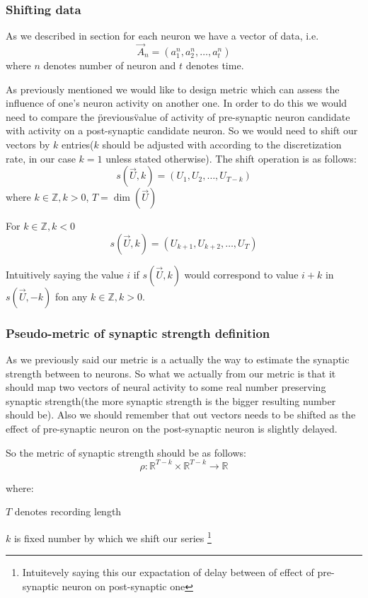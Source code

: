 \documentclass{article}
\begin{document}
	\subsubsection{Shifting data}
	As we described in  section for each neuron we have a vector of data, i.e.
	\[
		\vec{A}_n = (a_1^n, a_2^n, \dots, a_t^n)
	\]
	where $n$ denotes number of neuron and $t$ denotes time.

	As previously mentioned we would like to design metric which can assess the influence of one's neuron activity on
	another one.
	In order to do this we would need to compare the \"previous\" value of activity of pre-synaptic neuron candidate with
	activity on a post-synaptic candidate neuron.
	So we would need to shift our vectors by $k$ entries($k$ should be adjusted with according to the discretization rate,
	in our case $k=1$ unless stated otherwise).
	The shift operation is as follows:
	\[
		s(\vec{U}, k) = (U_1, U_2, \dots, U_{T-k})
	\]
	where $k \in \mathbb{Z}, k > 0$, $T=\dim(\vec{U})$

	For $k\in \mathbb{Z}, k < 0$
	\[
		s(\vec{U}, k) = (U_{k+1}, U_{k+2}, \dots, U_{T})
	\]

	Intuitively saying the value $i$ if $s(\vec{U}, k)$ would correspond to value $i + k$ in $s(\vec{U}, -k)$ fon
	any $k\in\mathbb{Z}, k > 0$.

	\subsubsection{Pseudo-metric of synaptic strength definition}
	As we previously said our metric is a actually the way to estimate the synaptic strength between to neurons.
	So what we actually from our metric is that it should map two vectors of neural activity to some real number preserving
	synaptic strength(the more synaptic strength is the bigger resulting number should be). Also we should remember that
	out vectors needs to be shifted as the effect of pre-synaptic neuron on the post-synaptic neuron is slightly delayed.

	So the metric of synaptic strength should be as follows:
	\[
		\rho: \mathbb{R}^{T-k}\times\mathbb{R}^{T-k} \to \mathbb{R}
	\]

	where:

	\textbullet  $T$ denotes recording length

	\textbullet $k$ is fixed number by which we shift our series
				\footnote{Intuitevely saying this our expactation of delay between of effect of pre-synaptic neuron on post-synaptic one}
\end{document}
